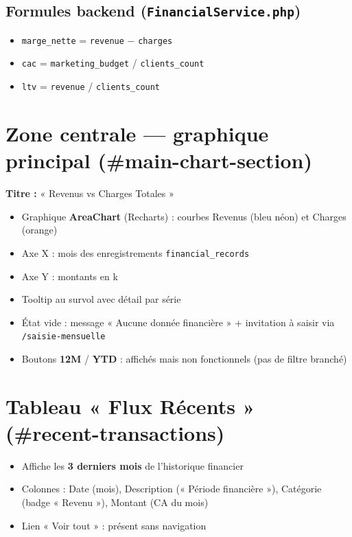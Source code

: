 \documentclass[11pt,a4paper]{report}
\newcommand{\filepath}[1]{\texttt{\small #1}}
\newcommand{\route}[1]{\texttt{\small #1}}
\begin{document}
\subsection{Formules backend (\filepath{FinancialService.php})}

\begin{itemize}[leftmargin=1.5em]
    \item \texttt{marge\_nette} = \texttt{revenue} $-$ \texttt{charges}
    \item \texttt{cac} = \texttt{marketing\_budget} / \texttt{clients\_count}
    \item \texttt{ltv} = \texttt{revenue} / \texttt{clients\_count}
\end{itemize}

\section{Zone centrale — graphique principal (\#main-chart-section)}

\textbf{Titre :} « Revenus vs Charges Totales »

\begin{itemize}[leftmargin=1.5em]
    \item Graphique \textbf{AreaChart} (Recharts) : courbes Revenus (bleu néon) et Charges (orange)
    \item Axe X : mois des enregistrements \texttt{financial\_records}
    \item Axe Y : montants en k\,\€
    \item Tooltip au survol avec détail par série
    \item État vide : message « Aucune donnée financière » + invitation à saisir via \route{/saisie-mensuelle}
    \item Boutons \textbf{12M} / \textbf{YTD} : \textcolor{copifiwarn}{affichés mais non fonctionnels} (pas de filtre branché)
\end{itemize}

\section{Tableau « Flux Récents » (\#recent-transactions)}

\begin{itemize}[leftmargin=1.5em]
    \item Affiche les \textbf{3 derniers mois} de l'historique financier
    \item Colonnes : Date (mois), Description (« Période financière »), Catégorie (badge « Revenu »), Montant (CA du mois)
    \item Lien « Voir tout » : \textcolor{copifiwarn}{présent sans navigation}
\end{itemize}
\end{document}
